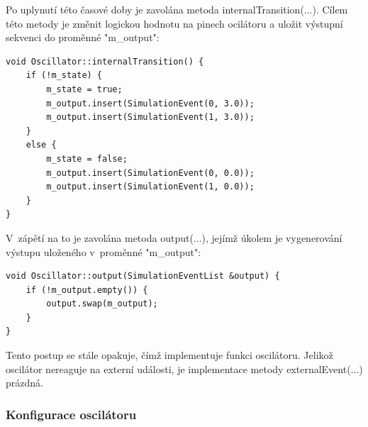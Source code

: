 Po uplynutí této časové doby je zavolána metoda internalTransition(...). Cílem této metody je změnit logickou hodnotu na pinech ocilátoru a uložit výstupní sekvenci do proměnné "m\_output":

\begin{lstlisting}
void Oscillator::internalTransition() {
	if (!m_state) {
		m_state = true;
		m_output.insert(SimulationEvent(0, 3.0));
		m_output.insert(SimulationEvent(1, 3.0));
	}
	else {
		m_state = false;
		m_output.insert(SimulationEvent(0, 0.0));
		m_output.insert(SimulationEvent(1, 0.0));
	}
}
\end{lstlisting}

V~zápětí na to je zavolána metoda output(...), jejímž úkolem je vygenerování výstupu uloženého v~proměnné "m\_output":

\begin{lstlisting}
void Oscillator::output(SimulationEventList &output) {
	if (!m_output.empty()) {
		output.swap(m_output);
	}
}
\end{lstlisting}

Tento postup se stále opakuje, čímž implementuje funkci oscilátoru. Jelikož oscilátor nereaguje na externí události, je implementace metody externalEvent(...) prázdná.

\subsubsection{Konfigurace oscilátoru}

